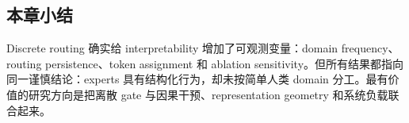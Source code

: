 
\subsection{本章小结}

Discrete routing 确实给 interpretability 增加了可观测变量：domain frequency、routing persistence、token assignment 和 ablation sensitivity。但所有结果都指向同一谨慎结论：experts 具有结构化行为，却未按简单人类 domain 分工。最有价值的研究方向是把离散 gate 与因果干预、representation geometry 和系统负载联合起来。

